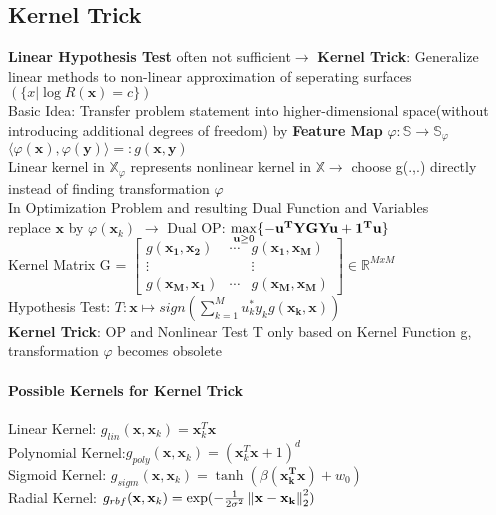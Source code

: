 \begin{sectionbox}
	\subsection{Kernel Trick}
	\textbf{Linear Hypothesis Test} often not sufficient$\rightarrow$ \textbf{Kernel Trick}: Generalize linear methods to non-linear approximation of seperating surfaces $(\{x|\log R(\mathbf{x})=c\})$ \\
	Basic Idea: Transfer problem statement into higher-dimensional space(without introducing additional degrees of freedom) by \textbf{Feature Map} $\varphi: \mathbb{S}\rightarrow\mathbb{S}_{\varphi}$
	\\ 
	$\boxed{\langle\varphi(\mathbf{x}),\varphi(\mathbf{y})\rangle=:g(\mathbf{x,y})}$ \\
	Linear kernel in $\mathbb{X}_\varphi$ represents nonlinear kernel in $\mathbb{X} \rightarrow$ choose g(.,.) directly instead of finding transformation $\varphi$  \\
	In Optimization Problem and resulting Dual Function and Variables \\replace $\mathbf{x}$ by $\varphi(\mathbf{x}_k)$ $\rightarrow$ Dual OP: $\smash{\displaystyle\max_{\mathbf{u}\geq0}}\{-\mathbf{u^TYGYu +1^Tu}\}\\$ \\
	Kernel Matrix G = $\begin{bmatrix}
		g(\mathbf{x_1,x_2}) &\cdots& g(\mathbf{x_1,x_M}) \\
		\vdots&&\vdots \\
		g(\mathbf{x_M,x_1}) &\cdots& g(\mathbf{x_M,x_M}) 
	\end{bmatrix} \in \mathbb{R}^{MxM}$ \\
	Hypothesis Test: $\boxed{T:\mathbf{x}\mapsto sign(\sum_{k=1}^{M}u_k^*y_kg(\mathbf{x_k,x}))}$\\
	\textbf{Kernel Trick}: OP and Nonlinear Test T only based on Kernel Function g, transformation $\varphi$ becomes obsolete
\end{sectionbox}
\begin{sectionbox}
	\paragraph{Possible Kernels for Kernel Trick}
	Linear Kernel: $g_{lin}(\mathbf{x},\mathbf{x}_k)=\mathbf{x}_k^T\mathbf{x}$\\
	Polynomial Kernel:$g_{poly}(\mathbf{x},\mathbf{x}_k)=(\mathbf{x}_k^T\mathbf{x}+1)^d$\\
	Sigmoid Kernel: $g_{sigm}(\mathbf{x},\mathbf{x}_k)=\tanh(\beta(\mathbf{x_k^Tx})+w_0)$ \\
	Radial Kernel: $g_{rbf}(\mathbf{x},\mathbf{x}_k)=\exp(-\frac{1}{2\sigma^2}\left\|\mathbf{x-x_k}\right\|_2^2)$
\end{sectionbox}	